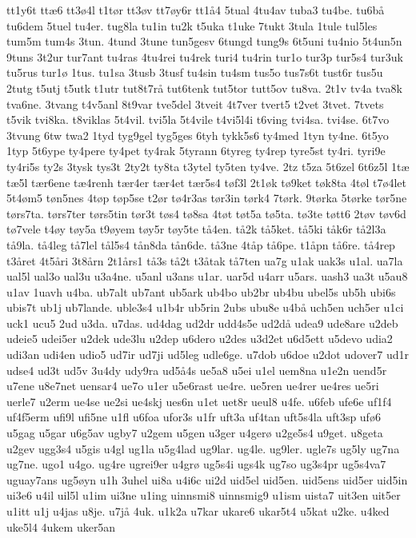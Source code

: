 {tt1y6t
ttæ6
tt3ø4l
t1tør
tt3øv
tt7øy6r
tt1å4
5tual
4tu4av
tuba3
tu4be.
tu6bå
tu6dem
5tuel
tu4er.
tug8la
tu1in
tu2k
t5uka
t1uke
7tukt
3tula
1tule
tul5les
tum5m
tum4s
3tun.
4tund
3tune
tun5gesv
6tungd
tung9s
6t5uni
tu4nio
5t4un5n
9tuns
3t2ur
tur7ant
tu4ras
4tu4rei
tu4rek
turi4
tu4rin
tur1o
tur3p
tur5s4
tur3uk
tu5rus
tur1ø
1tus.
tu1sa
3tusb
3tusf
tu4sin
tu4sm
tus5o
tus7s6t
tust6r
tus5u
2tutg
t5utj
t5utk
t1utr
tut8t7rå
tut6tenk
tut5tor
tutt5ov
tu8va.
2t1v
tv4a
tva8k
tva6ne.
3tvang
t4v5anl
8t9var
tve5del
3tveit
4t7ver
tvert5
t2vet
3tvet.
7tvets
t5vik
tvi8ka.
t8viklas
5t4vil.
tvi5la
5t4vile
t4vi5l4i
t6ving
tvi4sa.
tvi4se.
6t7vo
3tvung
6tw
twa2
1tyd
tyg9gel
tyg5ges
6tyh
tykk5s6
ty4med
1tyn
ty4ne.
6t5yo
1typ
5t6ype
ty4pere
ty4pet
ty4rak
5tyrann
6tyreg
ty4rep
tyre5st
ty4ri.
tyri9e
ty4ri5s
ty2s
3tysk
tys3t
2ty2t
ty8ta
t3ytel
ty5ten
ty4ve.
2tz
t5za
5t6zel
6t6z5l
1tæ
tæ5l
tær6ene
tæ4renh
tær4er
tær4et
tær5s4
tøf3l
2t1øk
tø9ket
tøk8ta
4tøl
t7ø4let
5t4øm5
tøn5nes
4tøp
tøp5se
t2ør
tø4r3as
tør3in
tørk4
7tørk.
9tørka
5tørke
tør5ne
tørs7ta.
tørs7ter
tørs5tin
tør3t
tøs4
tø8sa
4tøt
tøt5a
tø5ta.
tø3te
tøtt6
2tøv
tøv6d
tø7vele
t4øy
tøy5a
t9øyem
tøy5r
tøy5te
tå4en.
tå2k
tå5ket.
tå5ki
tåk6r
tå2l3a
tå9la.
tå4leg
tå7lel
tål5s4
tån8da
tån6de.
tå3ne
4tåp
tå6pe.
t1åpn
tå6re.
tå4rep
t3året
4t5åri
3t8årn
2t1års1
tå3s
tå2t
t3åtak
tå7ten
ua7g
u1ak
uak3s
u1al.
ua7la
ual5l
ual3o
ual3u
u3a4ne.
u5anl
u3ans
u1ar.
uar5d
u4arr
u5ars.
uash3
ua3t
u5au8
u1av
1uavh
u4ba.
ub7alt
ub7ant
ub5ark
ub4bo
ub2br
ub4bu
ubel5s
ub5h
ubi6s
ubis7t
ub1j
ub7lande.
uble3s4
u1b4r
ub5rin
2ubs
ubu8e
u4bå
uch5en
uch5er
u1ci
uck1
ucu5
2ud
u3da.
u7das.
ud4dag
ud2dr
udd4s5e
ud2då
udea9
ude8are
u2deb
udeie5
udei5er
u2dek
ude3lu
u2dep
u6dero
u2des
u3d2et
u6d5ett
u5devo
udia2
udi3an
udi4en
udio5
ud7ir
ud7ji
ud5leg
udle6ge.
u7dob
u6doe
u2dot
udover7
ud1r
udse4
ud3t
ud5v
3u4dy
udy9ra
ud5å4s
ue5a8
u5ei
u1el
uem8na
u1e2n
uend5r
u7ene
u8e7net
uensar4
ue7o
u1er
u5e6rast
ue4re.
ue5ren
ue4rer
ue4res
ue5ri
uerle7
u2erm
ue4se
ue2si
ue4skj
ues6n
u1et
uet8r
ueul8
u4fe.
u6feb
ufe6e
uf1f4
uf4f5erm
ufi9l
ufi5ne
u1fl
u6foa
ufor3s
u1fr
uft3a
uf4tan
uft5s4la
uft3sp
ufø6
u5gag
u5gar
u6g5av
ugby7
u2gem
u5gen
u3ger
u4gerø
u2ge5s4
u9get.
u8geta
u2gev
ugg3s4
u5gis
u4gl
ug1la
u5g4lad
ug9lar.
ug4le.
ug9ler.
ugle7s
ug5ly
ug7na
ug7ne.
ugo1
u4go.
ug4re
ugrei9er
u4grø
ug5s4i
ugs4k
ug7so
ug3s4pr
ug5s4va7
uguay7ans
ug5øyn
u1h
3uhel
ui8a
u4i6c
ui2d
uid5el
uid5en.
uid5ens
uid5er
uid5in
ui3e6
u4il
uil5l
u1im
ui3ne
u1ing
uinnsmi8
uinnsmig9
u1ism
uista7
uit3en
uit5er
u1itt
u1j
u4jas
u8je.
u7jå
4uk.
u1k2a
u7kar
ukare6
ukar5t4
u5kat
u2ke.
u4ked
uke5l4
4ukem
uker5an
}
